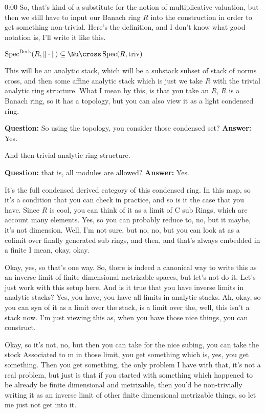 \begin{unfinished}{0:00}
So, that's kind of a substitute for the notion of multiplicative valuation, but then we still have to input our Banach ring $R$ into the construction in order to get something non-trivial. Here's the definition, and I don't know what good notation is, I'll write it like this.

$\Spec^\Berk (R, \norm{\cdot}) \subseteq \Nu \cross \Spec(R, \text{triv})$ 

This will be an analytic stack, which will be a substack subset of stack of norms cross, and then some affine analytic stack which is just we take $R$ with the trivial analytic ring structure. What I mean by this, is that you take an $R$, $R$ is a Banach ring, so it has a topology, but you can also view it as a light condensed ring. 

\textbf{Question:} So using the topology, you consider those condensed set?
\textbf{Answer:} Yes.

And then trivial analytic ring structure.

\textbf{Question:} that is, all modules are allowed?
\textbf{Answer:} Yes.


It's the full condensed derived category of this condensed ring.
In this map, so it's a condition that you can check in practice, and so is it the case that you have. Since $R$ is cool, you can think of it as a limit of C sub Rings, which are account many elements. Yes, so you can probably reduce to, no, but it maybe, it's not dimension. Well, I'm not sure, but no, no, but you can look at as a colimit over finally generated sub rings, and then, and that's always embedded in a finite I mean, okay, okay.

Okay, yes, so that's one way. So, there is indeed a canonical way to write this as an inverse limit of finite dimensional metrizable spaces, but let's not do it. Let's just work with this setup here. And is it true that you have inverse limits in analytic stacks? Yes, you have, you have all limits in analytic stacks. Ah, okay, so you can syn of it as a limit over the stack, is a limit over the, well, this isn't a stack now. I'm just viewing this as, when you have those nice things, you can construct.

Okay, so it's not, no, but then you can take for the nice subing, you can take the stock Associated to m in those limit, you get something which is, yes, you get something. Then you get something, the only problem I have with that, it's not a real problem, but just is that if you started with something which happened to be already be finite dimensional and metrizable, then you'd be non-trivially writing it as an inverse limit of other finite dimensional metrizable things, so let me just not get into it.


\end{unfinished}
